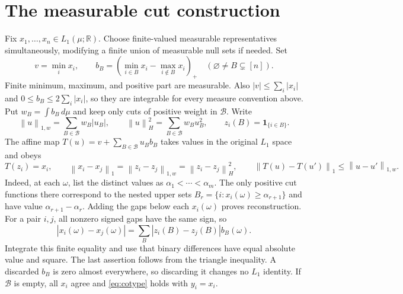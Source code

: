 \documentclass[11pt]{article}
\newcommand{\R}{\mathbb R}
\newcommand{\norm}[1]{\left\lVert#1\right\rVert}
\newcommand{\1}{\mathbf1}
\begin{document}
\section{The measurable cut construction}
Fix $x_1,\dots,x_n\in L_1(\mu;\R)$. Choose finite-valued measurable representatives simultaneously, modifying a finite union of measurable null sets if needed. Set
\[
 v=\min_i x_i,\qquad b_B=\left(\min_{i\in B}x_i-\max_{i\notin B}x_i\right)_+
 \quad(\varnothing\ne B\subsetneq[n]).
\]
Finite minimum, maximum, and positive part are measurable. Also $|v|\leq\sum_i|x_i|$ and $0\leq b_B\leq2\sum_i|x_i|$, so they are integrable for every measure convention above. Put $w_B=\int b_B\,d\mu$ and keep only cuts of positive weight in $\mathcal B$. Write
\[
 \norm{u}_{1,w}=\sum_{B\in\mathcal B}w_B|u_B|,\qquad
 \norm{u}_H^2=\sum_{B\in\mathcal B}w_Bu_B^2,\qquad
 z_i(B)=\1_{\{i\in B\}}.
\]
The affine map $T(u)=v+\sum_{B\in\mathcal B}u_Bb_B$ takes values in the original $L_1$ space and obeys
\begin{equation}\label{eq:cuts}
 T(z_i)=x_i,\qquad
 \norm{x_i-x_j}_1=\norm{z_i-z_j}_{1,w}=\norm{z_i-z_j}_H^2,
 \qquad \norm{T(u)-T(u')}_1\leq\norm{u-u'}_{1,w}.
\end{equation}
Indeed, at each $\omega$, list the distinct values as $\alpha_1<\cdots<\alpha_m$. The only positive cut functions there correspond to the nested upper sets $B_r=\{i:x_i(\omega)\geq\alpha_{r+1}\}$ and have value $\alpha_{r+1}-\alpha_r$. Adding the gaps below each $x_i(\omega)$ proves reconstruction. For a pair $i,j$, all nonzero signed gaps have the same sign, so
\[
 |x_i(\omega)-x_j(\omega)|=\sum_B|z_i(B)-z_j(B)|b_B(\omega).
\]
Integrate this finite equality and use that binary differences have equal absolute value and square. The last assertion follows from the triangle inequality. A discarded $b_B$ is zero almost everywhere, so discarding it changes no $L_1$ identity. If $\mathcal B$ is empty, all $x_i$ agree and \eqref{eq:cotype} holds with $y_i=x_i$.
\end{document}
